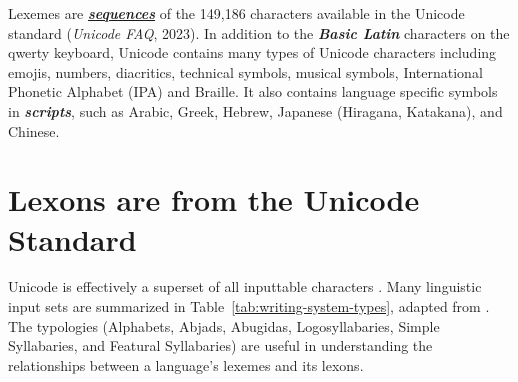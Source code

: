 Lexemes are \emph{\textbf{\uline{sequences}}} of the 149,186 characters
available in the Unicode standard (\emph{Unicode FAQ}, 2023). In
addition to the \emph{\textbf{Basic Latin}} characters on the qwerty
keyboard, Unicode contains many types of Unicode characters including
emojis, numbers, diacritics, technical symbols, musical symbols,
International Phonetic Alphabet (IPA) and Braille. It also contains
language specific symbols in \emph{\textbf{scripts}}, such as Arabic,
Greek, Hebrew, Japanese (Hiragana, Katakana), and Chinese.

\section{Lexons are from the Unicode Standard}\label{lexons-are-from-the-unicode-standard}

Unicode is effectively a superset of all inputtable characters
\parencite{UnicodeConsortium2025Unicode170}. Many linguistic input sets
are summarized in Table~\ref{tab:writing-system-types}, adapted from
\textcite{UnicodeConsortium2025Unicode170}. The typologies (Alphabets,
Abjads, Abugidas, Logosyllabaries, Simple Syllabaries, and Featural
Syllabaries) are useful in understanding the relationships between a
language's lexemes and its lexons.

